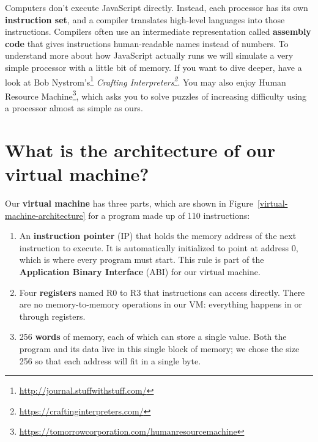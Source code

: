 \documentclass[krantzl]{krantz}
\newcommand{\figref}[1]{Figure~\ref{#1}}
\newcommand{\glossref}[1]{\textbf{#1}}
\newcommand{\hreffoot}[2]{{#1}\footnote{\href{#2}{#2}}}
\begin{document}
Computers don't execute JavaScript directly.
Instead,
each processor has its own \glossref{instruction set},
and a compiler translates high-level languages into those instructions.
Compilers often use an intermediate representation called \glossref{assembly code}
that gives instructions human-readable names instead of numbers.
To understand more about how JavaScript actually runs
we will simulate a very simple processor with a little bit of memory.
If you want to dive deeper,
have a look at \hreffoot{Bob Nystrom's}{http://journal.stuffwithstuff.com/} \emph{\hreffoot{Crafting Interpreters}{https://craftinginterpreters.com/}}.
You may also enjoy \hreffoot{Human Resource Machine}{https://tomorrowcorporation.com/humanresourcemachine},
which asks you to solve puzzles of increasing difficulty
using a processor almost as simple as ours.

\section{What is the architecture of our virtual machine?}\label{virtual-machine-arch}


Our \glossref{virtual machine} has three parts,
which are shown in \figref{virtual-machine-architecture}
for a program made up of 110 instructions:

\begin{enumerate}

\item 

An \glossref{instruction pointer} (IP)
    that holds the memory address of the next instruction to execute.
    It is automatically initialized to point at address 0,
    which is where every program must start.
    This rule is part of the \glossref{Application Binary Interface} (ABI)
    for our virtual machine.



\item 

Four \glossref{registers} named R0 to R3 that instructions can access directly.
    There are no memory-to-memory operations in our VM:
    everything  happens in or through registers.



\item 

256 \glossref{words} of memory, each of which can store a single value.
    Both the program and its data live in this single block of memory;
    we chose the size 256 so that each address will fit in a single byte.



\end{enumerate}
\end{document}

